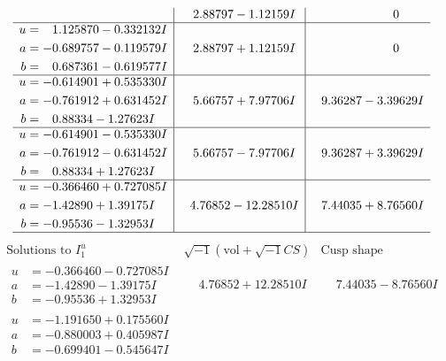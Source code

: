 \documentclass[1p]{elsarticle_modified}
\theoremstyle{definition}
\newcommand{\I}{\sqrt{-1}}
\begin{document}
$$\begin{array}{c|c|c}
 & \phantom{-}2.88797 - 1.12159 I & \phantom{-0.000000 } 0 \\ \hline\begin{aligned}
u &= \phantom{-}1.125870 - 0.332132 I \\
a &= -0.689757 - 0.119579 I \\
b &= \phantom{-}0.687361 - 0.619577 I\end{aligned}
 & \phantom{-}2.88797 + 1.12159 I & \phantom{-0.000000 } 0 \\ \hline\begin{aligned}
u &= -0.614901 + 0.535330 I \\
a &= -0.761912 + 0.631452 I \\
b &= \phantom{-}0.88334 - 1.27623 I\end{aligned}
 & \phantom{-}5.66757 + 7.97706 I & \phantom{-}9.36287 - 3.39629 I \\ \hline\begin{aligned}
u &= -0.614901 - 0.535330 I \\
a &= -0.761912 - 0.631452 I \\
b &= \phantom{-}0.88334 + 1.27623 I\end{aligned}
 & \phantom{-}5.66757 - 7.97706 I & \phantom{-}9.36287 + 3.39629 I \\ \hline\begin{aligned}
u &= -0.366460 + 0.727085 I \\
a &= -1.42890 + 1.39175 I \\
b &= -0.95536 - 1.32953 I\end{aligned}
 & \phantom{-}4.76852 - 12.28510 I & \phantom{-}7.44035 + 8.76560 I\\
 \hline 
 \end{array}$$\newpage$$\begin{array}{c|c|c}  
\text{Solutions to }I^u_{1}& \I (\text{vol} + \sqrt{-1}CS) & \text{Cusp shape}\\
 \hline 
\begin{aligned}
u &= -0.366460 - 0.727085 I \\
a &= -1.42890 - 1.39175 I \\
b &= -0.95536 + 1.32953 I\end{aligned}
 & \phantom{-}4.76852 + 12.28510 I & \phantom{-}7.44035 - 8.76560 I \\ \hline\begin{aligned}
u &= -1.191650 + 0.175560 I \\
a &= -0.880003 + 0.405987 I \\
b &= -0.699401 - 0.545647 I\end{aligned}

\end{array}$$
\end{document}
